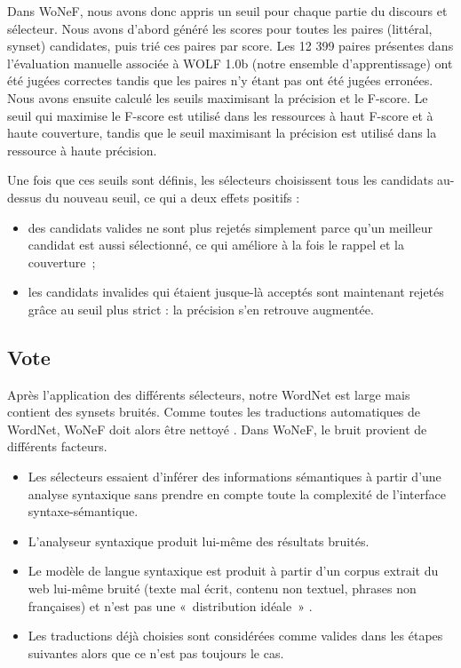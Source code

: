 Dans WoNeF, nous avons donc appris un seuil pour chaque partie du discours et
sélecteur. Nous avons d'abord généré les scores pour toutes les paires
(littéral, synset) candidates, puis trié ces paires par score. Les 12 399
paires présentes dans l'évaluation manuelle associée à WOLF 1.0b (notre
ensemble d'apprentissage) ont été jugées correctes tandis que les paires n'y
étant pas ont été jugées erronées. Nous avons ensuite calculé les seuils
maximisant la précision et le F-score. Le seuil qui maximise le F-score est
utilisé dans les ressources à haut F-score et à haute couverture, tandis que le
seuil maximisant la précision est utilisé dans la ressource à haute précision.

Une fois que ces seuils sont définis, les sélecteurs choisissent tous les
candidats au-dessus du nouveau seuil, ce qui a deux effets positifs :

\begin{itemize}

    \item des candidats valides ne sont plus rejetés simplement parce qu'un
        meilleur candidat est aussi sélectionné, ce qui améliore à la fois le
        rappel et la couverture~;

    \item les candidats invalides qui étaient jusque-là acceptés sont
        maintenant rejetés grâce au seuil plus strict : la précision s'en
        retrouve augmentée.

\end{itemize}

\subsection{Vote}
\label{subsec:voting}

Après l'application des différents sélecteurs, notre WordNet est large mais
contient des synsets bruités. Comme toutes les traductions automatiques de
WordNet, WoNeF doit alors être nettoyé \citep{sagot2012cleaning}. Dans WoNeF,
le bruit provient de différents facteurs.

\begin{itemize}

    \item Les sélecteurs essaient d'inférer des informations sémantiques à
        partir d'une analyse syntaxique sans prendre en compte toute la
        complexité de l'interface syntaxe-sémantique.

    \item L'analyseur syntaxique produit lui-même des résultats bruités.

    \item Le modèle de langue syntaxique est produit à partir d'un corpus
        extrait du web lui-même bruité (texte mal écrit, contenu non textuel,
        phrases non françaises) et n'est pas une «~distribution idéale~»
        \citep{copestake2013lexicalised}.

    \item Les traductions déjà choisies sont considérées comme valides dans les
        étapes suivantes alors que ce n'est pas toujours le cas.

\end{itemize}

